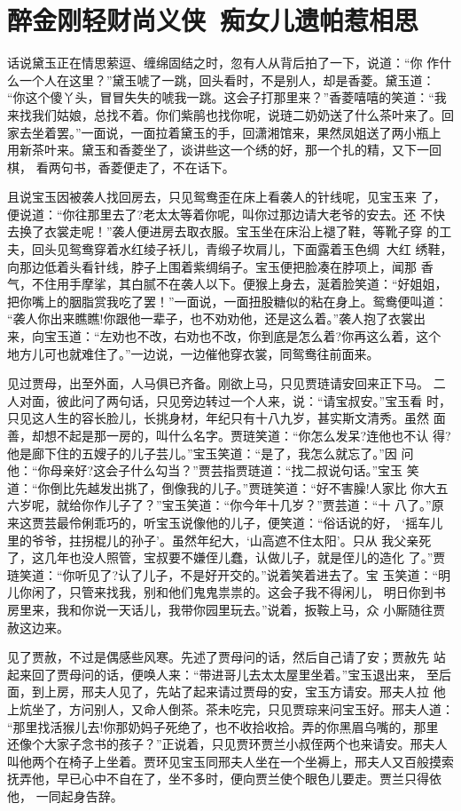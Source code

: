 \chapter{醉金刚轻财尚义侠~痴女儿遗帕惹相思}

话说黛玉正在情思萦逗、缠绵固结之时，忽有人从背后拍了一下，说道：“你
作什么一个人在这里？”黛玉唬了一跳，回头看时，不是别人，却是香菱。黛玉道：
“你这个傻丫头，冒冒失失的唬我一跳。这会子打那里来？”香菱嘻嘻的笑道：“我
来找我们姑娘，总找不着。你们紫鹃也找你呢，说琏二奶奶送了什么茶叶来了。回
家去坐着罢。”一面说，一面拉着黛玉的手，回潇湘馆来，果然凤姐送了两小瓶上
用新茶叶来。黛玉和香菱坐了，谈讲些这一个绣的好，那一个扎的精，又下一回棋，
看两句书，香菱便走了，不在话下。

且说宝玉因被袭人找回房去，只见鸳鸯歪在床上看袭人的针线呢，见宝玉来
了，便说道：“你往那里去了?老太太等着你呢，叫你过那边请大老爷的安去。还
不快去换了衣裳走呢！”袭人便进房去取衣服。宝玉坐在床沿上褪了鞋，等靴子穿
的工夫，回头见鸳鸯穿着水红绫子袄儿，青缎子坎肩儿，下面露着玉色绸，大红
绣鞋，向那边低着头看针线，脖子上围着紫绸绢子。宝玉便把脸凑在脖项上，闻那
香气，不住用手摩挲，其白腻不在袭人以下。便猴上身去，涎着脸笑道：“好姐姐，
把你嘴上的胭脂赏我吃了罢！”一面说，一面扭股糖似的粘在身上。鸳鸯便叫道：
“袭人你出来瞧瞧!你跟他一辈子，也不劝劝他，还是这么着。”袭人抱了衣裳出
来，向宝玉道：“左劝也不改，右劝也不改，你到底是怎么着?你再这么着，这个
地方儿可也就难住了。”一边说，一边催他穿衣裳，同鸳鸯往前面来。

见过贾母，出至外面，人马俱已齐备。刚欲上马，只见贾琏请安回来正下马。
二人对面，彼此问了两句话，只见旁边转过一个人来，说：“请宝叔安。”宝玉看
时，只见这人生的容长脸儿，长挑身材，年纪只有十八九岁，甚实斯文清秀。虽然
面善，却想不起是那一房的，叫什么名字。贾琏笑道：“你怎么发呆?连他也不认
得?他是廊下住的五嫂子的儿子芸儿。”宝玉笑道：“是了，我怎么就忘了。”因
问他：“你母亲好?这会子什么勾当？”贾芸指贾琏道：“找二叔说句话。”宝玉
笑道：“你倒比先越发出挑了，倒像我的儿子。”贾琏笑道：“好不害臊!人家比
你大五六岁呢，就给你作儿子了？”宝玉笑道：“你今年十几岁？”贾芸道：“十
八了。”原来这贾芸最伶俐乖巧的，听宝玉说像他的儿子，便笑道：“俗话说的好，
‘摇车儿里的爷爷，拄拐棍儿的孙子’。虽然年纪大，‘山高遮不住太阳’。只从
我父亲死了，这几年也没人照管，宝叔要不嫌侄儿蠢，认做儿子，就是侄儿的造化
了。”贾琏笑道：“你听见了?认了儿子，不是好开交的。”说着笑着进去了。宝
玉笑道：“明儿你闲了，只管来找我，别和他们鬼鬼祟祟的。这会子我不得闲儿，
明日你到书房里来，我和你说一天话儿，我带你园里玩去。”说着，扳鞍上马，众
小厮随往贾赦这边来。

见了贾赦，不过是偶感些风寒。先述了贾母问的话，然后自己请了安；贾赦先
站起来回了贾母问的话，便唤人来：“带进哥儿去太太屋里坐着。”宝玉退出来，
至后面，到上房，邢夫人见了，先站了起来请过贾母的安，宝玉方请安。邢夫人拉
他上炕坐了，方问别人，又命人倒茶。茶未吃完，只见贾琮来问宝玉好。邢夫人道：
“那里找活猴儿去!你那奶妈子死绝了，也不收拾收拾。弄的你黑眉乌嘴的，那里
还像个大家子念书的孩子？”正说着，只见贾环贾兰小叔侄两个也来请安。邢夫人
叫他两个在椅子上坐着。贾环见宝玉同邢夫人坐在一个坐褥上，邢夫人又百般摸索
抚弄他，早已心中不自在了，坐不多时，便向贾兰使个眼色儿要走。贾兰只得依他，
一同起身告辞。

